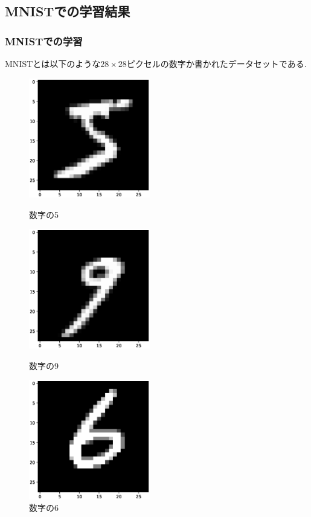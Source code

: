 \documentclass[dvipdfmx,11pt]{beamer}		%
\begin{document}
    \subsection{MNISTでの学習結果}
    \begin{frame}
        \frametitle{MNISTでの学習}
        MNISTとは以下のような$28\times28$ピクセルの数字か書かれたデータセットである. 
        \begin{figure}[htbp]
            \begin{minipage}{0.32\hsize}
                \centering
                \includegraphics[width = 5.3cm]{Image/MNIST_sample1.eps}
                \caption{数字の5}
            \end{minipage}
            \begin{minipage}{0.32\hsize}
                \centering
                \includegraphics[width = 5.3cm]{Image/MNIST_sample2.eps}
                \caption{数字の9}
            \end{minipage}
            \begin{minipage}{0.32\hsize}
                \centering
                \includegraphics[width = 5.3cm]{Image/MNIST_sample3.eps}
                \caption{数字の6}
            \end{minipage}
        \end{figure}
    \end{frame}
\end{document}
